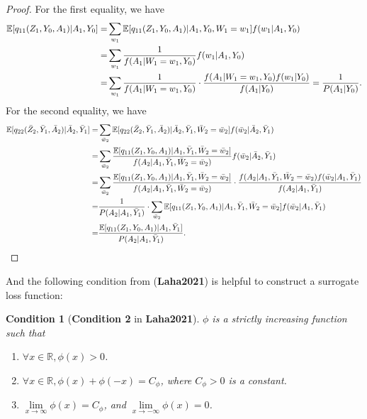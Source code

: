 \documentclass[10pt]{article}
\newtheorem{cond}{Condition}
\theoremstyle{remark} \newtheorem{rem}{Remark}
\begin{document}
\begin{proof}
    For the first equality, we have
    \begin{align}
        \mathbb{E}[q_{11}(Z_1,Y_0,A_1)|A_1,Y_0] =& \sum_{w_1} \mathbb{E}[q_{11}(Z_1,Y_0,A_1)|A_1,Y_0,W_1=w_1]f(w_1|A_1,Y_0) \notag\\
        =& \sum_{w_1} \frac{1}{f(A_1|W_1=w_1,Y_0)}f(w_1|A_1,Y_0) \notag\\
        =& \sum_{w_1} \frac{1}{f(A_1|W_1=w_1,Y_0)}\cdot\frac{f(A_1|W_1=w_1,Y_0)f(w_1|Y_0)}{f(A_1|Y_0)} = \frac{1}{P(A_1|Y_0)}.
    \end{align}
    For the second equality, we have
    \begin{align}
        \mathbb{E}[q_{22}(\bar Z_2,\bar Y_1,\bar A_2)|\bar A_2, \bar Y_1] =& \sum_{\bar w_2}\mathbb{E}[q_{22}(\bar Z_2,\bar Y_1,\bar A_2)|\bar A_2, \bar Y_1, \bar W_2=\bar w_2]f(\bar w_2|\bar A_2, \bar Y_1) \notag\\
        =& \sum_{\bar w_2}\frac{\mathbb{E}[q_{11}(Z_1, Y_0, A_1)|A_1, \bar Y_1, \bar W_2=\bar w_2]}{f(A_2|A_1,\bar Y_1,\bar W_2=\bar w_2)}f(\bar w_2|\bar A_2, \bar Y_1)\notag\\
        =& \sum_{\bar w_2}\frac{\mathbb{E}[q_{11}(Z_1, Y_0, A_1)|A_1, \bar Y_1, \bar W_2=\bar w_2]}{f(A_2|A_1,\bar Y_1,\bar W_2=\bar w_2)}\cdot \frac{f(A_2|A_1,\bar Y_1,\bar W_2=\bar w_2)f(\bar w_2|A_1,\bar Y_1)}{f(A_2|A_1,\bar Y_1)} \notag\\
        =&\frac{1}{P(A_2|A_1,\bar Y_1)}\cdot\sum_{\bar w_2}\mathbb{E}[q_{11}(Z_1, Y_0, A_1)|A_1, \bar Y_1, \bar W_2=\bar w_2]f(\bar w_2|A_1,\bar Y_1) \notag\\
        =&\frac{\mathbb{E}[q_{11}(Z_1, Y_0, A_1)|A_1, \bar Y_1]}{P(A_2|A_1,\bar Y_1)}.
    \end{align}
\end{proof}


And the following condition from (\textbf{Laha2021}) is helpful to construct a surrogate loss function: 
\begin{cond}[\textbf{Condition 2} in \textbf{Laha2021}]
        $\phi$ is a strictly increasing function such that
        \begin{enumerate}  
            \item $\forall x \in \mathbb{R}, \phi(x) > 0$.
            \item $\forall x \in \mathbb{R}, \phi(x)+\phi(-x)=C_\phi$, where $C_\phi >0$ is a constant.
            \item $\lim\limits_{x\to\infty} \phi(x)=C_\phi$, and $\lim\limits_{x\to-\infty}\phi(x)=0$.
        \end{enumerate}
        \label{cond2laha}
\end{cond}
\end{document}
